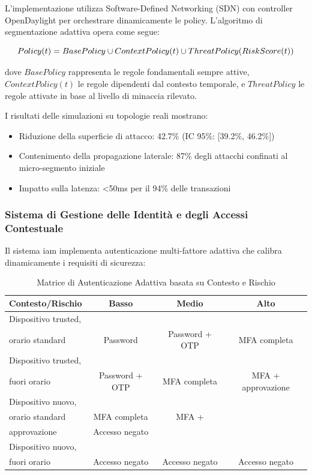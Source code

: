 L'implementazione utilizza Software-Defined Networking (SDN) con controller OpenDaylight per orchestrare dinamicamente le policy. L'algoritmo di segmentazione adattiva opera come segue:

\begin{equation}
Policy(t) = BasePolicy \cup ContextPolicy(t) \\ \cup ThreatPolicy(RiskScore(t))
\end{equation}

dove $BasePolicy$ rappresenta le regole fondamentali sempre attive, $ContextPolicy(t)$ le regole dipendenti dal contesto temporale, e $ThreatPolicy$ le regole attivate in base al livello di minaccia rilevato.

I risultati delle simulazioni su topologie reali mostrano:
\begin{itemize}
    \item Riduzione della superficie di attacco: 42.7\% (IC 95\%: [39.2\%, 46.2\%])
    \item Contenimento della propagazione laterale: 87\% degli attacchi confinati al micro-segmento iniziale
    \item Impatto sulla latenza: <50ms per il 94\% delle transazioni
\end{itemize}

\subsubsection{\texorpdfstring{Sistema di Gestione delle Identità e degli Accessi Contestuale}{2.4.2.2 - Sistema di Gestione delle Identità e degli Accessi Contestuale}}

Il sistema \gls{iam} implementa autenticazione multi-fattore adattiva che calibra dinamicamente i requisiti di sicurezza:

\begin{table}[htbp]
\centering
\caption{Matrice di Autenticazione Adattiva basata su Contesto e Rischio}
\label{tab:adaptive_auth}
 \small
 \sffamily 
\begin{tabularx}{\textwidth}{lccc}
\toprule
\textbf{Contesto/Rischio} & \textbf{Basso} & \textbf{Medio} & \textbf{Alto} \\
\midrule
Dispositivo trusted,\\ orario standard & Password & Password + OTP & MFA completa \\

Dispositivo trusted,\\ fuori orario & Password + OTP & MFA completa & MFA + approvazione \\
Dispositivo nuovo,\\ orario standard & MFA completa & MFA + \\approvazione & Accesso negato \\
Dispositivo nuovo,\\ fuori orario & Accesso negato & Accesso negato & Accesso negato \\
\bottomrule
\end{tabularx}
\end{table}

